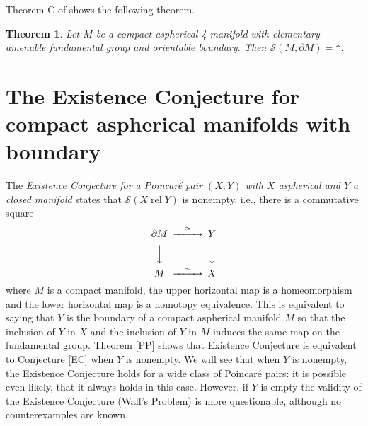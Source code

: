 \documentclass[12pt]{amsart}
\newtheorem{theorem}{Theorem}
\theoremstyle{definition}
\DeclareMathOperator{\rel}{rel}
\newcommand{\cS}{\mathcal S}
\begin{document}
 Theorem C of \cite{DH2} shows the following theorem.
 
\begin{theorem}
Let $M$ be a compact aspherical 4-manifold with elementary amenable fundamental group and orientable boundary.   Then  $\cS(M,\partial M) = *$.
\end{theorem}





\section{The Existence Conjecture for compact aspherical manifolds with boundary} \label{existence}

\medskip
The {\em  Existence Conjecture for a Poincar\'e pair $(X,Y)$ with $X$ aspherical and $Y$  a closed manifold} states that $\cS(X \rel Y)$ is nonempty, i.e., there is a commutative square 
$$
\begin{CD}
\partial M @>\cong>> Y\\
@VVV @VVV \\
M @>\sim>> X
\end{CD}
$$
where $M$ is a compact manifold, the upper horizontal map is a homeomorphism and the lower horizontal map is a homotopy equivalence.    This is equivalent to saying that $Y$ is the boundary of a compact aspherical manifold $M$ so that the inclusion of $Y$ in $X$ and the inclusion of $Y$ in $M$ induces the same map on the fundamental group.  Theorem \ref{PP} shows that Existence Conjecture is equivalent to Conjecture \ref{EC} when $Y$ is nonempty.
We will see that when $Y$ is nonempty, the  Existence Conjecture holds for a wide class of Poincar\'e pairs:  it is possible even likely, that it always holds in this case.    However, if $Y$ is empty the validity of the Existence Conjecture (Wall's Problem) is more questionable, although no counterexamples are known.   
\end{document}
